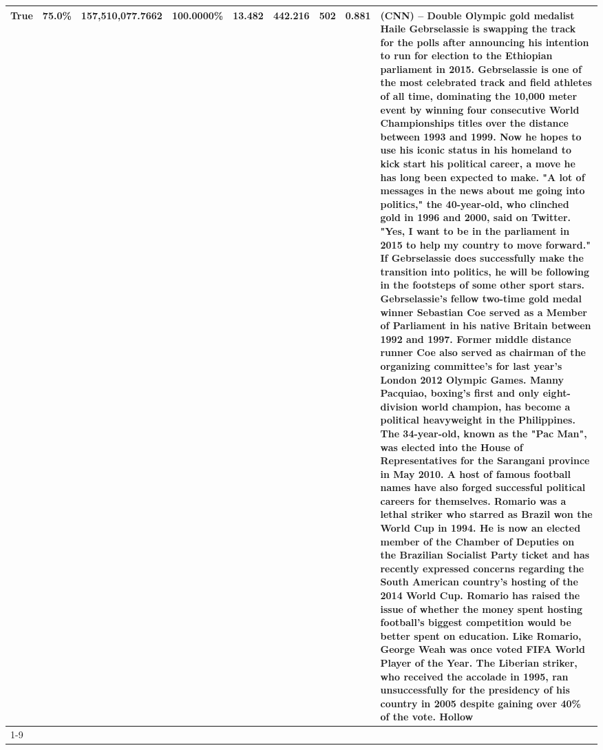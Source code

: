 \begin{table}[H]
{\begin{tabular}{lllrlllll}
True & 75.0\% & 157,510,077.7662 & \bfseries \color{red} 100.0000\% & 13.482 & 442.216 & 502 & 0.881 & (CNN) -- Double Olympic gold medalist Haile Gebrselassie is swapping the track for the polls after announcing his intention to run for election to the Ethiopian parliament in 2015. Gebrselassie is one of the most celebrated track and field athletes of all time, dominating the 10,000 meter event by winning four consecutive World Championships titles over the distance between 1993 and 1999. Now he hopes to use his iconic status in his homeland to kick start his political career, a move he has long been expected to make. "A lot of messages in the news about me going into politics," the 40-year-old, who clinched gold in 1996 and 2000, said on Twitter. "Yes, I want to be in the parliament in 2015 to help my country to move forward." If Gebrselassie does successfully make the transition into politics, he will be following in the footsteps of some other sport stars. Gebrselassie's fellow two-time gold medal winner Sebastian Coe served as a Member of Parliament in his native Britain between 1992 and 1997. Former middle distance runner Coe also served as chairman of the organizing committee's for last year's London 2012 Olympic Games. Manny Pacquiao, boxing's first and only eight-division world champion, has become a political heavyweight in the Philippines. The 34-year-old, known as the "Pac Man", was elected into the House of Representatives for the Sarangani province in May 2010. A host of famous football names have also forged successful political careers for themselves. Romario was a lethal striker who starred as Brazil won the World Cup in 1994. He is now an elected member of the Chamber of Deputies on the Brazilian Socialist Party ticket and has recently expressed concerns regarding the South American country's hosting of the 2014 World Cup. Romario has raised the issue of whether the money spent hosting football's biggest competition would be better spent on education. Like Romario, George Weah was once voted FIFA World Player of the Year. The Liberian striker, who received the accolade in 1995, ran unsuccessfully for the presidency of his country in 2005 despite gaining over 40\% of the vote. Hollow \\
\cline{1-9}

\end{tabular}}
\end{table}
